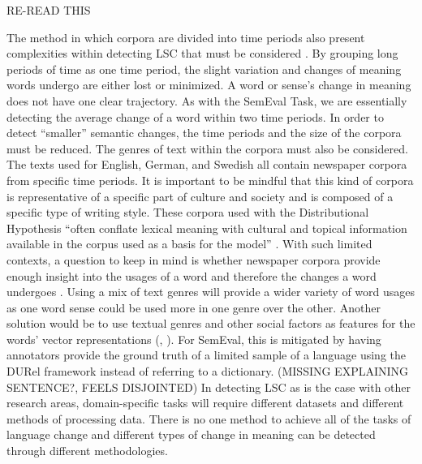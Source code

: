 RE-READ THIS

The method in which corpora are divided into time periods also present complexities within detecting LSC that must be considered \citep{hengchen2021challenges}. By grouping long periods of time as one time period, the slight variation and changes of meaning words undergo are either lost or minimized. A word or sense’s change in meaning does not have one clear trajectory. As with the SemEval Task, we are essentially detecting the average change of a word within two time periods. In order to detect “smaller” semantic changes, the time periods and the size of the corpora must be reduced. The genres of text within the corpora must also be considered. The texts used for English, German, and Swedish all contain newspaper corpora from specific time periods. It is important to be mindful that this kind of corpora is representative of a specific part of culture and society and is composed of a specific type of writing style. These corpora used with the Distributional Hypothesis “often conflate lexical meaning with cultural and topical information available in the corpus used as a basis for the model” \citep{hengchen2021challenges}. With such limited contexts, a question to keep in mind is whether newspaper corpora provide enough insight into the usages of a word and therefore the changes a word undergoes \citep{hengchen2021challenges}. Using a mix of text genres will provide a wider variety of word usages as one word sense could be used more in one genre over the other. Another solution would be to use textual genres and other social factors as features for the words' vector representations (\citet{perrone-etal-2019-gasc}, \citet{jawahar-seddah-2019-contextualized}). For SemEval, this is mitigated by having annotators provide the ground truth of a limited sample of a language using the DURel framework \citep{DURel2018} instead of referring to a dictionary. (MISSING EXPLAINING SENTENCE?, FEELS DISJOINTED) In detecting LSC as is the case with other research areas, domain-specific tasks will require different datasets and different methods of processing data. There is no one method to achieve all of the tasks of language change and different types of change in meaning can be detected through different methodologies. 
